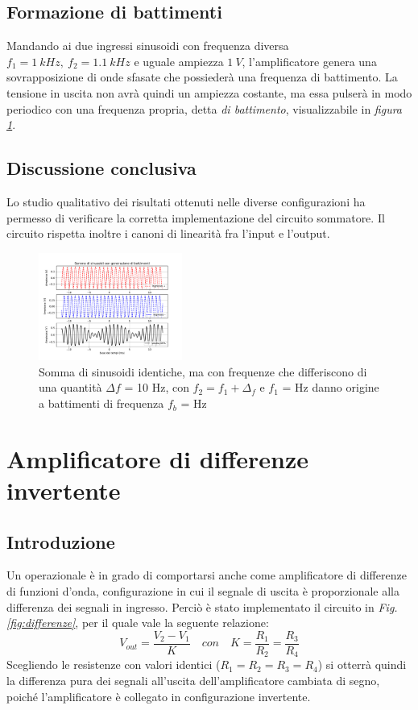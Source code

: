 \documentclass[journal]{IEEEtran}
\begin{document}
\subsection{\textbf{Formazione di battimenti}}
Mandando ai due ingressi sinusoidi con frequenza diversa $f_1 = 1\ kHz, \ f_2 = 1.1\ kHz$ e uguale ampiezza $1 \ V$, l'amplificatore genera una sovrapposizione di onde sfasate che possiederà una frequenza di battimento. La tensione in uscita non avrà quindi un ampiezza costante, ma essa pulserà in modo periodico con una frequenza propria, detta \textit{di battimento}, visualizzabile in \textit{figura \ref{fig:beats}}.

\subsection{\textbf{Discussione conclusiva}}
Lo studio qualitativo dei risultati ottenuti nelle diverse configurazioni ha permesso di verificare la corretta implementazione del circuito sommatore. Il circuito rispetta inoltre i canoni di linearità fra l'input e l'output. 

\begin{figure}[H]%
\begin{center}
\includegraphics[width=0.42\textwidth]{analysis/output/OPA_mixer_beats.pdf}
\caption{Somma di sinusoidi identiche, ma con frequenze che differiscono di una quantità $\Delta f$ = 10 Hz, con $f_2 = f_1 + \Delta_f$ e $f_1$ = Hz  danno origine a battimenti di frequenza $f_b$ = Hz}
\label{fig:beats}
\end{center}
\end{figure}


\section{\textbf{Amplificatore di differenze invertente \label{par:differenze}}} %
\subsection{\textbf{Introduzione}}
Un operazionale è in grado di comportarsi anche come amplificatore di differenze di funzioni d'onda, configurazione in cui il segnale di uscita è proporzionale alla differenza dei segnali in ingresso. Perciò è stato implementato il circuito in \textit{Fig.  \ref{fig:differenze}}, per il quale vale la seguente relazione: 
\[V_{out} =\frac{V_2 - V_1}{K} \quad con \quad K = \frac{R_1}{R_2}=\frac{R_3}{R_4} \tag{2} \] 
Scegliendo le resistenze con valori identici ($R_1 = R_2 = R_3 =R_4 $) si otterrà quindi la differenza pura dei segnali all'uscita dell'amplificatore cambiata di segno, poiché l'amplificatore è collegato in configurazione invertente.
\end{document}
